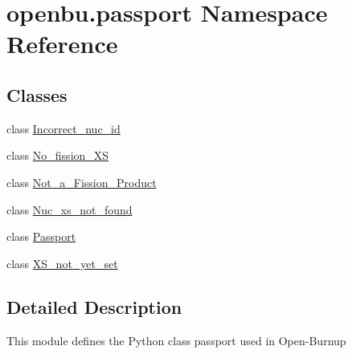 \hypertarget{namespaceopenbu_1_1passport}{}\section{openbu.\+passport Namespace Reference}
\label{namespaceopenbu_1_1passport}
\subsection*{Classes}
\begin{DoxyCompactItemize}
\item 
class \mbox{\hyperlink{classopenbu_1_1passport_1_1_incorrect__nuc__id}{Incorrect\+\_\+nuc\+\_\+id}}
\item 
class \mbox{\hyperlink{classopenbu_1_1passport_1_1_no__fission___x_s}{No\+\_\+fission\+\_\+\+XS}}
\item 
class \mbox{\hyperlink{classopenbu_1_1passport_1_1_not__a___fission___product}{Not\+\_\+a\+\_\+\+Fission\+\_\+\+Product}}
\item 
class \mbox{\hyperlink{classopenbu_1_1passport_1_1_nuc__xs__not__found}{Nuc\+\_\+xs\+\_\+not\+\_\+found}}
\item 
class \mbox{\hyperlink{classopenbu_1_1passport_1_1_passport}{Passport}}
\item 
class \mbox{\hyperlink{classopenbu_1_1passport_1_1_x_s__not__yet__set}{X\+S\+\_\+not\+\_\+yet\+\_\+set}}
\end{DoxyCompactItemize}


\subsection{Detailed Description}
\begin{DoxyVerb}This module defines the Python class passport used in Open-Burnup\end{DoxyVerb}
 